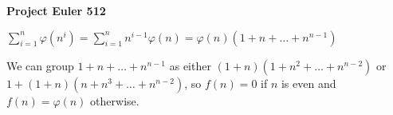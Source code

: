 \documentclass[a4paper,12pt]{article}
\begin{document}
\setlength\parindent{0pt}
\textbf{Project Euler 512}
\vspace{5ex}

\(\sum_{i = 1}^n \varphi (n^i) = \sum_{i = 1}^n n^{i - 1} \varphi (n) = \varphi(n) (1 + n + \dots + n^{n - 1})\)

We can group \(1 + n + \dots + n^{n - 1}\) as either \((1+n)(1 + n^2 + \dots + n^{n - 2})\) or \(1 + (1 + n)(n + n^3 + \dots + n^{n - 2})\), so \(f(n) = 0\) if \(n\) is even and \(f(n) = \varphi(n)\) otherwise.
\end{document}
